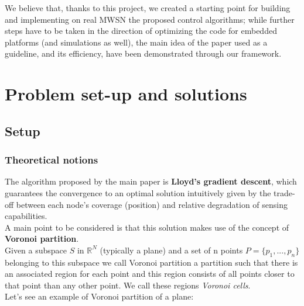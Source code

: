 \documentclass[a4paper,11pt,oneside]{book}
\begin{document}
	We believe that, thanks to this project, we created a starting point for building and implementing on real MWSN the proposed control algorithms; while further steps have to be taken in the direction of optimizing the code for embedded platforms (and simulations as well), the main idea of the paper used as a guideline, and its efficiency, have been demonstrated through our framework.\\

	
	
	\chapter{Problem set-up and solutions}
	
	
	\section{Setup}
	\subsection {Theoretical notions}
	
	The algorithm proposed by the main paper is \textbf{Lloyd's gradient descent}, which guarantees the convergence to an optimal solution intuitively given by the trade-off between each node's coverage (position) and relative degradation of sensing capabilities.\\
	A main point to be considered is that this solution makes use of the concept of \textbf{Voronoi partition}.\\
	Given a subspace $S$ in $\mathbb{R}^N$ (typically a plane) and a set of n points $P=\{p_1,...,p_n\}$ belonging to this subspace we call Voronoi partition a partition such that there is an associated region for each point and this region consists of all points closer to that point than any other point. We call these regions \emph{Voronoi cells}.\\
	Let's see an example of Voronoi partition of a plane:\\
	
\end{document}
